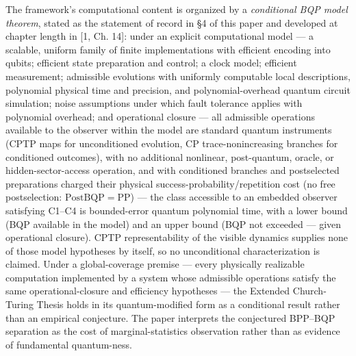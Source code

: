 \documentclass[
]{article}
\begin{document}
The framework's computational content is organized by a
\emph{conditional BQP model theorem}, stated as the statement of record
in §4 of this paper and developed at chapter length in {[}1, Ch. 14{]}:
under an explicit computational model --- a scalable, uniform family of
finite implementations with efficient encoding into qubits; efficient
state preparation and control; a clock model; efficient measurement;
admissible evolutions with uniformly computable local descriptions,
polynomial physical time and precision, and polynomial-overhead quantum
circuit simulation; noise assumptions under which fault tolerance
applies with polynomial overhead; and operational closure --- all
admissible operations available to the observer within the model are
standard quantum instruments (CPTP maps for unconditioned evolution, CP
trace-nonincreasing branches for conditioned outcomes), with no
additional nonlinear, post-quantum, oracle, or hidden-sector-access
operation, and with conditioned branches and postselected preparations
charged their physical success-probability/repetition cost (no free
postselection: \(\mathrm{PostBQP} = \mathrm{PP}\)) --- the class
accessible to an embedded observer satisfying C1--C4 is bounded-error
quantum polynomial time, with a lower bound (BQP available in the model)
and an upper bound (BQP not exceeded --- given operational closure).
CPTP representability of the visible dynamics supplies none of those
model hypotheses by itself, so no unconditional characterization is
claimed. Under a global-coverage premise --- every physically realizable
computation implemented by a system whose admissible operations satisfy
the same operational-closure and efficiency hypotheses --- the Extended
Church-Turing Thesis holds in its quantum-modified form as a conditional
result rather than an empirical conjecture. The paper interprets the
conjectured BPP--BQP separation as the cost of marginal-statistics
observation rather than as evidence of fundamental quantum-ness.
\end{document}
